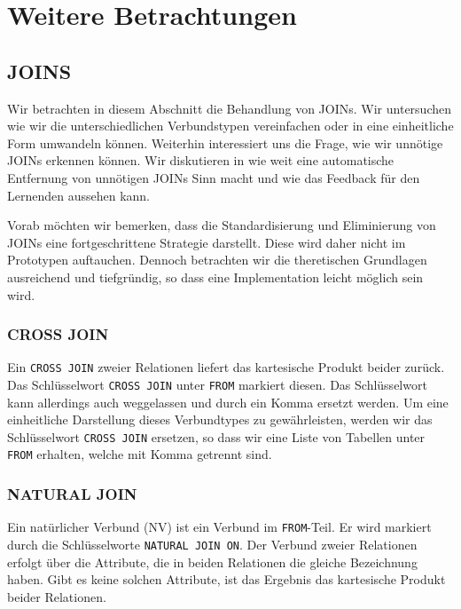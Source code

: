 \section{Weitere Betrachtungen}

\subsection{JOINS}

Wir betrachten in diesem Abschnitt die Behandlung von JOINs. Wir untersuchen wie wir die unterschiedlichen Verbundstypen vereinfachen oder in eine einheitliche Form umwandeln können. Weiterhin interessiert uns die Frage, wie wir unnötige JOINs erkennen können. Wir diskutieren in wie weit eine automatische Entfernung von unnötigen JOINs Sinn macht und wie das Feedback für den Lernenden aussehen kann.

Vorab möchten wir bemerken, dass die Standardisierung und Eliminierung von JOINs eine fortgeschrittene Strategie darstellt. Diese wird daher nicht im Prototypen auftauchen. Dennoch betrachten wir die theretischen Grundlagen ausreichend und tiefgründig, so dass eine Implementation leicht möglich sein wird.

\subsubsection*{CROSS JOIN}

Ein \verb|CROSS JOIN| zweier Relationen liefert das kartesische Produkt beider zurück. Das Schlüsselwort \verb|CROSS JOIN| unter \verb|FROM| markiert diesen. Das Schlüsselwort kann allerdings auch weggelassen und durch ein Komma ersetzt werden. Um eine einheitliche Darstellung dieses Verbundtypes zu gewährleisten, werden wir das Schlüsselwort \verb|CROSS JOIN| ersetzen, so dass wir eine Liste von Tabellen unter \verb|FROM| erhalten, welche mit Komma getrennt sind.

\subsubsection*{NATURAL JOIN}

Ein natürlicher Verbund (NV) ist ein Verbund im \verb|FROM|-Teil. Er wird markiert durch die Schlüsselworte \verb|NATURAL JOIN ON|. Der Verbund zweier Relationen erfolgt über die Attribute, die in beiden Relationen die gleiche Bezeichnung haben. Gibt es keine solchen Attribute, ist das Ergebnis das kartesische Produkt beider Relationen.

